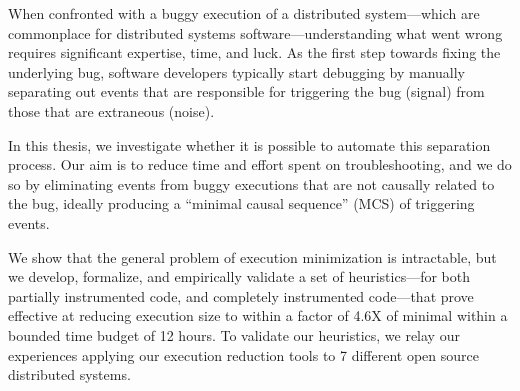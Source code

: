
%

When confronted with a buggy execution of a distributed system---which are
commonplace for distributed
systems software---understanding what went wrong requires significant expertise, time, and luck.
As the first step towards fixing the underlying bug, software developers typically
start debugging by manually separating out events that are responsible for triggering the bug (signal) from those that are extraneous (noise).

In this thesis, we investigate whether it is possible to automate this
separation process. Our aim is to reduce time and effort spent on
troubleshooting, and we do so by eliminating
events from buggy executions that are not causally related to the bug, ideally producing a ``minimal
causal sequence'' (MCS) of triggering events.

We show that the general problem of execution
minimization is intractable, but we develop, formalize, and
empirically validate a set of heuristics---for both partially instrumented code, and completely instrumented code---that prove effective at
reducing execution size to within a factor of 4.6X of minimal within a bounded
time budget of 12 hours.
To validate our heuristics, we relay our experiences applying our execution reduction
tools to 7 different open source distributed systems.
